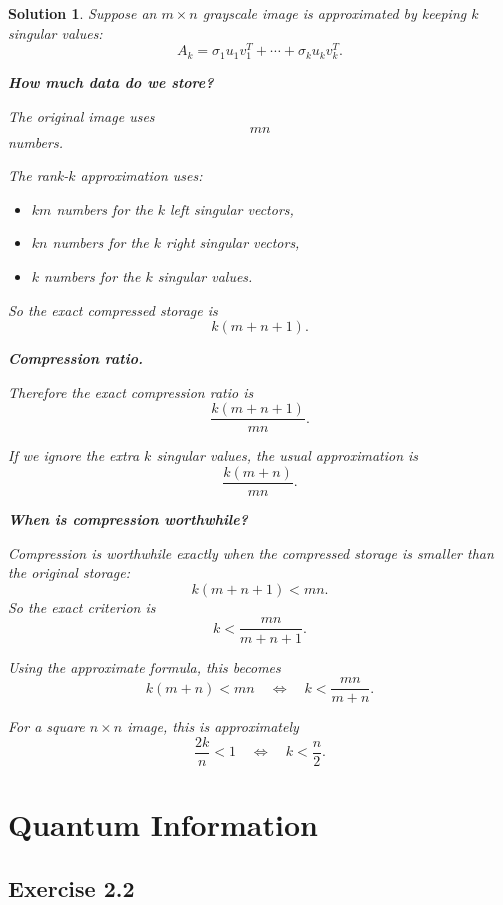 \documentclass[11pt,a4paper]{article}
\theoremstyle{sol}
\newtheorem*{solution}{Solution}
\begin{document}
\begin{solution}
Suppose an $m\times n$ grayscale image is approximated by keeping $k$ singular values:
\[
A_k=\sigma_1u_1v_1^T+\cdots+\sigma_ku_kv_k^T.
\]

\textbf{How much data do we store?}

The original image uses
\[
mn
\]
numbers.

The rank-$k$ approximation uses:
\begin{itemize}
  \item $km$ numbers for the $k$ left singular vectors,
  \item $kn$ numbers for the $k$ right singular vectors,
  \item $k$ numbers for the $k$ singular values.
\end{itemize}
So the exact compressed storage is
\[
k(m+n+1).
\]

\textbf{Compression ratio.}

Therefore the exact compression ratio is
\[
\boxed{\frac{k(m+n+1)}{mn}.}
\]

If we ignore the extra $k$ singular values, the usual approximation is
\[
\boxed{\frac{k(m+n)}{mn}.}
\]

\textbf{When is compression worthwhile?}

Compression is worthwhile exactly when the compressed storage is smaller than the original storage:
\[
k(m+n+1)<mn.
\]
So the exact criterion is
\[
\boxed{k<\frac{mn}{m+n+1}.}
\]

Using the approximate formula, this becomes
\[
k(m+n)<mn
\quad\Longleftrightarrow\quad
\boxed{k<\frac{mn}{m+n}.}
\]

For a square $n\times n$ image, this is approximately
\[
\frac{2k}{n}<1
\quad\Longleftrightarrow\quad
\boxed{k<\frac{n}{2}.}
\]
\end{solution}

\clearpage
\section{Quantum Information}

\subsection*{Exercise 2.2}
\end{document}
